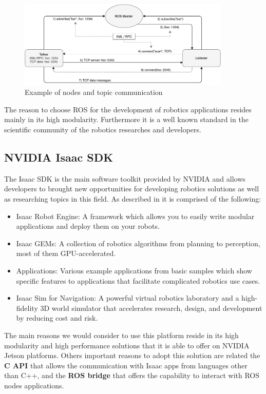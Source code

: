 \begin{figure}[tbp]
	\centering
	\includegraphics[width=0.9\textwidth]{images/ROSexample2.pdf}
	\caption{Example of nodes and topic communication}
	\label{fig:ros-nodes-topics}
\end{figure}

The reason to choose ROS for the development of robotics applications resides mainly in its high modularity. Furthermore it is a well known standard in the scientific community of the robotics researches and developers.




\subsection{NVIDIA Isaac SDK}
The Isaac SDK is the main software toolkit provided by NVIDIA and allows developers to brought new opportunities for developing robotics solutions as well as researching topics in this field. As described in \cite{ISAAC} it is comprised of the following:
\begin{itemize}
	\item Isaac Robot Engine: A framework which allows you to easily write modular applications and deploy them on your robots.
	\item Isaac GEMs: A collection of robotics algorithms from planning to perception, most of them GPU-accelerated.
	\item Applications: Various example applications from basic samples which show specific features to applications that facilitate complicated robotics use cases.
	\item Isaac Sim for Navigation: A powerful virtual robotics laboratory and a high-fidelity 3D world simulator that accelerates research, design, and development by reducing cost and risk.
\end{itemize}

The main reasons we would consider to use this platform reside in its high modularity and high performance solutions that it is able to offer on NVIDIA Jetson platforms.
Others important reasons to adopt this solution are related the \textbf{C API} that allows the communication with Isaac apps from languages other than C++, and the \textbf{ROS bridge} that offers the capability to interact with ROS nodes applications.

